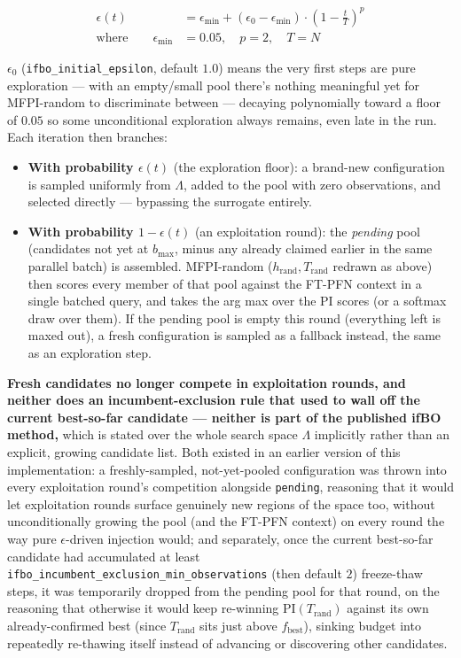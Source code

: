 \documentclass[10pt]{article}
\begin{document}
\begin{align}
\epsilon(t) &= \epsilon_{\min} + (\epsilon_0 - \epsilon_{\min}) \cdot \left(1 - \frac{t}{T}\right)^p \\
\text{where} \qquad \epsilon_{\min} &= 0.05, \quad p = 2, \quad T = N \nonumber
\end{align}

$\epsilon_0$ (\texttt{ifbo\_initial\_epsilon}, default $1.0$) means the very first steps are pure
exploration --- with an empty/small pool there's nothing meaningful yet for MFPI-random to
discriminate between --- decaying polynomially toward a floor of $0.05$ so some unconditional
exploration always remains, even late in the run. Each iteration then branches:

\begin{itemize}
    \item \textbf{With probability $\epsilon(t)$} (the exploration floor): a brand-new configuration is
    sampled uniformly from $\Lambda$, added to the pool with zero observations, and selected
    directly --- bypassing the surrogate entirely.
    \item \textbf{With probability $1-\epsilon(t)$} (an exploitation round): the \emph{pending} pool (candidates
    not yet at $b_{\max}$, minus any already claimed earlier in the same parallel batch)
    is assembled. MFPI-random ($h_\text{rand}, T_\text{rand}$
    redrawn as above) then scores every member of that pool against the
    FT-PFN context in a single batched query, and takes the arg max over the PI scores (or a
    softmax draw over them). If the pending pool is empty this round (everything left is
    maxed out), a fresh configuration is sampled as a fallback instead, the same as an
    exploration step.
\end{itemize}

\textbf{Fresh candidates no longer compete in exploitation rounds, and neither does an
incumbent-exclusion rule that used to wall off the current best-so-far candidate --- neither is
part of the published ifBO method,} which is stated over the whole search space $\Lambda$
implicitly rather than an explicit, growing candidate list. Both existed in an earlier version
of this implementation: a freshly-sampled, not-yet-pooled configuration was thrown into every
exploitation round's competition alongside \texttt{pending}, reasoning that it would let
exploitation rounds surface genuinely new regions of the space too, without unconditionally
growing the pool (and the FT-PFN context) on every round the way pure $\epsilon$-driven
injection would; and separately, once the current best-so-far candidate had accumulated at
least \texttt{ifbo\_incumbent\_exclusion\_min\_observations} (then default $2$) freeze-thaw
steps, it was temporarily dropped from the pending pool for that round, on the reasoning that
otherwise it would keep re-winning $\mathrm{PI}(T_\text{rand})$ against its own
already-confirmed best (since $T_\text{rand}$ sits just above $f_\text{best}$), sinking budget
into repeatedly re-thawing itself instead of advancing or discovering other candidates.
\end{document}
